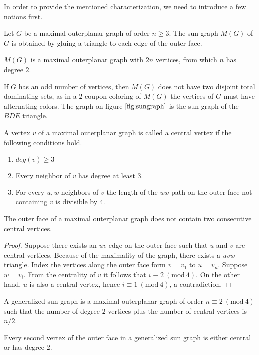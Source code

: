 In order to provide the mentioned characterization, we need to introduce a few
notions first.
\begin{definition}
  Let $G$ be a maximal outerplanar graph of order $n \ge 3$. The sun graph $M(G)$
  of $G$ is obtained by gluing a triangle to each edge of the outer face.
\end{definition}
\begin{remark}
  $M(G)$ is a maximal outerplanar graph with $2n$ vertices, from which $n$ has
  degree $2$.
\end{remark}
\begin{remark}
  If $G$ has an odd number of vertices, then $M(G)$ does not have two disjoint
  total dominating sets, as in a $2$-coupon coloring of $M(G)$ the vertices of
  $G$ must have alternating colors. The graph on figure $\ref{fig:sungraph}$ is
  the sun graph of the $BDE$ triangle.
\end{remark}
\begin{definition}
  A vertex $v$ of a maximal outerplanar graph is called a central vertex if the
  following conditions hold.
  \begin{enumerate}
    \item $deg(v) \ge 3$
    \item Every neighbor of $v$ has degree at least $3$.
    \item For every $u, w$ neighbors of $v$ the length of the $uw$ path on the
    outer face not containing $v$ is divisible by $4$.
  \end{enumerate}
\end{definition}
\begin{claim}
  The outer face of a maximal outerplanar graph does not contain two consecutive
  central vertices.
\end{claim}
\begin{proof}
  Suppose there exists an $uv$ edge on the outer face such that $u$ and $v$ are
  central vertices. Because of the maximality of the graph, there exists a $uvw$
  triangle. Index the vertices along the outer face form $v = v_1$ to $u = v_{n}$.
  Suppose $w = v_i$. From the centrality of $v$ it follows that $i \equiv 2\
  (\textrm{mod}\ 4)$. On the other hand, $u$ is also a central vertex, hence
  $i \equiv 1\ (\textrm{mod}\ 4)$, a contradiction.
\end{proof}
\begin{definition}
  A generalized sun graph is a maximal outerplanar graph of order
  $n \equiv 2\ (\textrm{mod}\ 4)$ such that the number of
  degree $2$ vertices plus the number of central vertices is $n/2$.
\end{definition}
\begin{remark}
  Every second vertex of the outer face in a generalized sun graph is either
  central or has degree $2$.
\end{remark}

